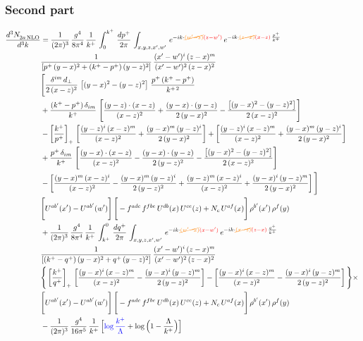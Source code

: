 \documentclass[9pt]{article}
\numberwithin{equation}{section}
\begin{document}
\subsubsection*{Second part}
\begin{align}
    \frac{d^{3}N_{2a\,\rm NLO}^{\rm}}{d^{3}k}  & =  \frac{1}{(2\pi)^{3}}\, \frac{g^{4}}{8\pi^{4}}\,\frac{1}{k^{+}}\,\int_{0}^{k^{+}}\, \frac{dp^{+}}{2\pi}\,\int_{x,y,z,x',w'}\, e^{-ik\cdot{\color{orange}\cancel{(w'-z)}}{\color{red}(z-w')}}\,e^{-ik\cdot {\color{orange}\cancel{(z-x)}}{\color{red}(x-z)}\,\frac{p^{+}}{k^{+}}}\,\notag \\ & \frac{1}{\left[p^{+}\,(y-x)^{2}+(k^{+}-p^{+})\,(y-z)^{2}\right]}\, \frac{(x'-w')^{i}\,(z-x)^{m}}{(x'-w')^{2}\,(z-x)^{2}} \notag \\ & \Bigg[\frac{\delta^{im}\,d_{\perp}}{2\,(x-z)^{2}}\,\left[(y-x)^{2}-(y-z)^{2}\right]\,\frac{p^{+}\,(k^{+}-p^{+})}{k^{+\,2}}\notag \\ & +\frac{(k^{+}-p^{+})\,\delta_{im}}{k^{+}}\,\left[\frac{(y-z)\cdot (x-z)}{(x-z)^{2}}+\frac{(y-x)\cdot (y-z)}{2\,(y-x)^{2}}-\frac{\left[(y-x)^{2}-(y-z)^{2}\right]}{2\,(x-z)^{2}}\right]\notag \\ & -\left[\frac{k^{+}}{p^{+}}\right]_{+}\,\left[\frac{(y-z)^{i}\,(x-z)^{m}}{(x-z)^{2}}+\frac{(y-x)^{m}\,(y-z)^{i}}{2\,(y-x)^{2}}\right]+ \left[\frac{(y-z)^{i}\,(x-z)^{m}}{(x-z)^{2}}+\frac{(y-x)^{m}\,(y-z)^{i}}{2\,(y-x)^{2}}\right]\notag \\ & +\frac{p^{+}\,\delta_{im}}{k^{+}}\,\left[\frac{(y-x)\cdot (x-z)}{(x-z)^{2}}-\frac{(y-x)\cdot (y-z)}{2\,(y-z)^{2}}-\frac{\left[(y-x)^{2}-(y-z)^{2}\right]}{2\,(x-z)^{2}}\right]\notag \\ &-\left[\frac{(y-x)^{m}\,(x-z)^{i}}{(x-z)^{2}}-\frac{(y-x)^{m}\,(y-z)^{i}}{2\,(y-z)^{2}}+\frac{(y-z)^{m}\,(x-z)^{i}}{(x-z)^{2}}+\frac{(y-x)^{i}\,(y-z)^{m}}{2\,(y-x)^{2}}\right]\Bigg] \notag \\ & \Bigg[U^{ab'}(x')-U^{ab'}(w')\Bigg]\,\Bigg[-f^{adc}\,f^{fbe}\,U^{db}(x)\,U^{ce}(z)+N_{c}\,U^{af}(x)\Bigg]\,\rho^{b'}(x')\,\rho^{f}(y)\notag \\ & + \frac{1}{(2\pi)^{3}}\,\frac{g^{4}}{8\pi^{4}}\,\frac{1}{k^{+}}\, \int^{0}_{k^{+}}\, \frac{dq^{+}}{2\pi} \,  \int_{x,y,z,x',w'}\,e^{-ik\cdot{\color{orange}\cancel{(w'-x)}}{\color{red}(x-w')}}\,e^{-ik\cdot {\color{orange}\cancel{(x-z)}}{\color{red}(z-x)}\,\frac{q^{+}}{k^{+}}}\,\notag \\ & \frac{1}{\left[(k^{+}-q^{+})\,(y-x)^{2}+q^{+}\,(y-z)^{2}\right]}\, \frac{(x'-w')^{i}\,(z-x)^{m}}{(x'-w')^{2}\,(z-x)^{2}} \notag \\ &\Bigg\{\left[\frac{k^{+}}{q^{+}}\right]_{+}\,\left[\frac{(y-x)^{i}\,(x-z)^{m}}{(x-z)^{2}}-\frac{(y-x)^{i}\,(y-z)^{m}}{2\,(y-z)^{2}}\right] -\left[\frac{(y-x)^{i}\,(x-z)^{m}}{(x-z)^{2}}-\frac{(y-x)^{i}\,(y-z)^{m}}{2\,(y-z)^{2}}\right]\Bigg\}\times\,\notag \\ & \Bigg[U^{ab'}(x')-U^{ab'}(w')\Bigg]\,\Bigg[-f^{adc}\,f^{fbe}\,U^{db}(x)\,U^{ce}(z)+N_{c}\,U^{af}(x)\Bigg]\,\rho^{b'}(x')\,\rho^{f}(y)\notag \\ & - \frac{1}{(2\pi)^{3}}\, \frac{g^{4}}{16\pi^{5}}\,\frac{1}{k^{+}}\,\Big[{\color{blue}\log\frac{k^{+}}{\Lambda}}+\log\Big(1-\frac{\Lambda}{k^{+}}\Big)\Big] 
\end{align}
\end{document}

